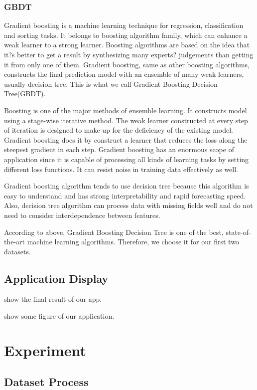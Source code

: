 \documentclass[letterpaper]{article} %
\begin{document}
\subsubsection{GBDT}

Gradient boosting is a machine learning technique for regression, classification and sorting tasks. It belongs to boosting algorithm family, which can enhance a weak learner to a strong learner. Boosting algorithms are based on the idea that it?s better to get a result by synthesizing many experts? judgements than getting it from only one of them. Gradient boosting, same as other boosting algorithms, constructs the final prediction model with an ensemble of many weak learners, usually decision tree. This is what we call Gradient Boosting Decision Tree(GBDT).

Boosting is one of the major methods of ensemble learning. It constructs model using a stage-wise iterative method. The weak learner constructed at every step of iteration is designed to make up for the deficiency of the existing model. Gradient boosting does it by construct a learner that reduces the loss along the steepest gradient in each step. Gradient boosting has an enormous scope of application since it is capable of processing all kinds of learning tasks by setting different loss functions. It can resist noise in training data effectively as well.

Gradient boosting algorithm tends to use decision tree because this algorithm is easy to understand and has strong interpretability and rapid forecasting speed. Also, decision tree algorithm can process data with missing fields well and do not need to consider interdependence between features.

According to above, Gradient Boosting Decision Tree is one of the best, state-of-the-art machine learning algorithms. Therefore, we choose it for our first two datasets.

\subsection{Application Display}

show the final result of our app.

show some figure of our application.

\section{Experiment}

\subsection{Dataset Process}
\end{document}

